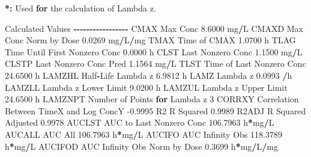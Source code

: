 \documentclass[
  12pt,
]{krantz}
\newenvironment{Shaded}{\begin{snugshade}}{\end{snugshade}}
\newcommand{\ControlFlowTok}[1]{\textcolor[rgb]{0.13,0.29,0.53}{\textbf{#1}}}
\newcommand{\DecValTok}[1]{\textcolor[rgb]{0.00,0.00,0.81}{#1}}
\newcommand{\ErrorTok}[1]{\textcolor[rgb]{0.64,0.00,0.00}{\textbf{#1}}}
\newcommand{\FloatTok}[1]{\textcolor[rgb]{0.00,0.00,0.81}{#1}}
\newcommand{\NormalTok}[1]{#1}
\newcommand{\OperatorTok}[1]{\textcolor[rgb]{0.81,0.36,0.00}{\textbf{#1}}}
\newcommand{\StringTok}[1]{\textcolor[rgb]{0.31,0.60,0.02}{#1}}
\begin{document}
\begin{Shaded}
\begin{Highlighting}[]
\OperatorTok{*}\ErrorTok{:}\StringTok{ }\NormalTok{Used }\ControlFlowTok{for}\NormalTok{ the calculation of Lambda z.}


\NormalTok{Calculated Values}
\OperatorTok{{-}{-}{-}{-}{-}{-}{-}{-}{-}{-}{-}{-}{-}{-}{-}{-}{-}}
\NormalTok{CMAX       Max Conc                                        }\FloatTok{8.6000}\NormalTok{ mg}\OperatorTok{/}\NormalTok{L}
\NormalTok{CMAXD      Max Conc Norm by Dose                           }\FloatTok{0.0269}\NormalTok{ mg}\OperatorTok{/}\NormalTok{L}\OperatorTok{/}\NormalTok{mg}
\NormalTok{TMAX       Time of CMAX                                    }\FloatTok{1.0700}\NormalTok{ h}
\NormalTok{TLAG       Time Until First Nonzero Conc                   }\FloatTok{0.0000}\NormalTok{ h}
\NormalTok{CLST       Last Nonzero Conc                               }\FloatTok{1.1500}\NormalTok{ mg}\OperatorTok{/}\NormalTok{L}
\NormalTok{CLSTP      Last Nonzero Conc Pred                          }\FloatTok{1.1564}\NormalTok{ mg}\OperatorTok{/}\NormalTok{L}
\NormalTok{TLST       Time of Last Nonzero Conc                      }\FloatTok{24.6500}\NormalTok{ h}
\NormalTok{LAMZHL     Half}\OperatorTok{{-}}\NormalTok{Life Lambda z                              }\FloatTok{6.9812}\NormalTok{ h}
\NormalTok{LAMZ       Lambda z                                        }\FloatTok{0.0993} \OperatorTok{/}\NormalTok{h}
\NormalTok{LAMZLL     Lambda z Lower Limit                            }\FloatTok{9.0200}\NormalTok{ h}
\NormalTok{LAMZUL     Lambda z Upper Limit                           }\FloatTok{24.6500}\NormalTok{ h}
\NormalTok{LAMZNPT    Number of Points }\ControlFlowTok{for}\NormalTok{ Lambda z                   }\DecValTok{3}
\NormalTok{CORRXY     Correlation Between TimeX and Log ConcY        }\FloatTok{{-}0.9995} 
\NormalTok{R2         R Squared                                       }\FloatTok{0.9989} 
\NormalTok{R2ADJ      R Squared Adjusted                              }\FloatTok{0.9978} 
\NormalTok{AUCLST     AUC to Last Nonzero Conc                      }\FloatTok{106.7963}\NormalTok{ h}\OperatorTok{*}\NormalTok{mg}\OperatorTok{/}\NormalTok{L}
\NormalTok{AUCALL     AUC All                                       }\FloatTok{106.7963}\NormalTok{ h}\OperatorTok{*}\NormalTok{mg}\OperatorTok{/}\NormalTok{L}
\NormalTok{AUCIFO     AUC Infinity Obs                              }\FloatTok{118.3789}\NormalTok{ h}\OperatorTok{*}\NormalTok{mg}\OperatorTok{/}\NormalTok{L}
\NormalTok{AUCIFOD    AUC Infinity Obs Norm by Dose                   }\FloatTok{0.3699}\NormalTok{ h}\OperatorTok{*}\NormalTok{mg}\OperatorTok{/}\NormalTok{L}\OperatorTok{/}\NormalTok{mg}

\end{Highlighting}
\end{Shaded}
\end{document}
